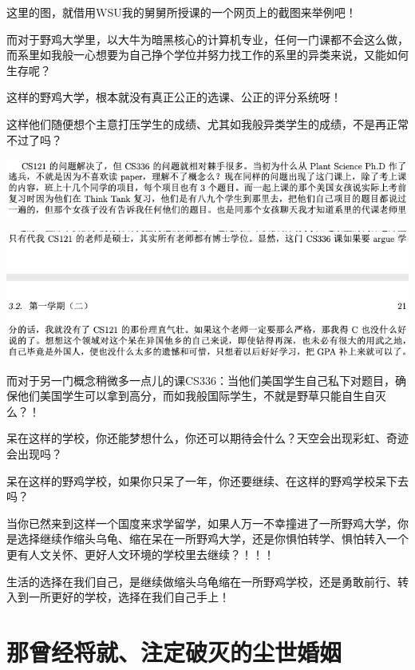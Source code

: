 \documentclass[9pt, b5paper]{article}
\begin{document}
这里的图，就借用WSU我的舅舅所授课的一个网页上的截图来举例吧！

而对于野鸡大学里，以大牛为暗黑核心的计算机专业，任何一门课都不会这么做，而系里如我般一心想要为自己挣个学位并努力找工作的系里的异类来说，又能如何生存呢？

这样的野鸡大学，根本就没有真正公正的选课、公正的评分系统呀！

这样他们随便想个主意打压学生的成绩、尤其如我般异类学生的成绩，不是再正常不过了吗？

\begin{center}
\includegraphics[width=.9\linewidth]{./pic/backups_plans_20210424_210204.png}
\end{center}

\begin{center}
\includegraphics[width=.9\linewidth]{./pic/backups_plans_20210424_210328.png}
\end{center}

而对于另一门概念稍微多一点儿的课CS336：当他们美国学生自己私下对题目，确保他们美国学生可以拿到高分，而如我般国际学生，不就是野草只能自生自灭么？！

呆在这样的学校，你还能梦想什么，你还可以期待会什么？天空会出现彩虹、奇迹会出现吗？

呆在这样的野鸡学校，如果你只呆了一年，你还要继续、在这样的野鸡学校呆下去吗？

当你已然来到这样一个国度来求学留学，如果人万一不幸撞进了一所野鸡大学，你是选择继续作缩头乌龟、缩在呆在一所野鸡大学，还是你惧怕转学、惧怕转入一个更有人文关怀、更好人文环境的学校里去继续？！！！

生活的选择在我们自己，是继续做缩头乌龟缩在一所野鸡学校，还是勇敢前行、转入到一所更好的学校，选择在我们自己手上！


\section{那曾经将就、注定破灭的尘世婚姻}
\label{sec:org3fe65cb}
\end{document}
